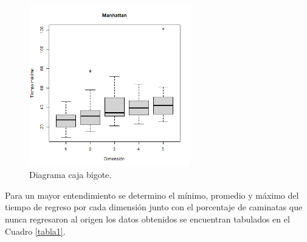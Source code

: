 \documentclass[a4paper]{article}
\begin{document}
\begin{figure}[h!]
\centering
\includegraphics[width=70mm]{p1mr.png}
\caption   { Diagrama caja bigote.\label{Fig.1}
\label{p1mr.png}}
\end{figure}
\justify
Para un mayor entendimiento se determino el mínimo, promedio y máximo del tiempo de regreso por cada dimensión junto con el porcentaje de caminatas que nunca regresaron al origen los datos obtenidos se encuentran tabulados en el Cuadro \ref{tabla1}.
\end{document}
